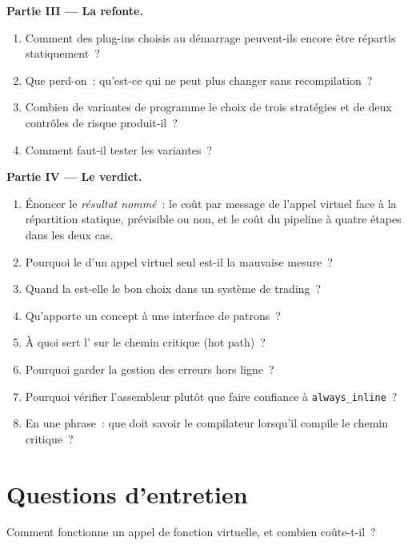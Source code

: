 \begin{problem}
\medskip\noindent\textbf{Partie III --- La refonte.}
\begin{enumerate}[resume]
\item Comment des plug-ins choisis au démarrage peuvent-ils encore être répartis statiquement~?
\item Que perd-on~: qu'est-ce qui ne peut plus changer sans recompilation~?
\item Combien de variantes de programme le choix de trois stratégies et de deux contrôles de risque produit-il~?
\item Comment faut-il tester les variantes~?
\end{enumerate}

\medskip\noindent\textbf{Partie IV --- Le verdict.}
\begin{enumerate}[resume]
\item Énoncer le \emph{résultat nommé}~: le coût par message de l'appel virtuel face à la répartition statique, prévisible ou non, et le
coût du pipeline à quatre étapes dans les deux cas.
\item Pourquoi le  d'un appel virtuel seul est-il la mauvaise mesure~?
\item Quand la  est-elle le bon choix dans un système de trading~?
\item Qu'apporte un concept à une interface de patrons~?
\item À quoi sert l' sur le chemin critique (hot path)~?
\item Pourquoi garder la gestion des erreurs hors ligne~?
\item Pourquoi vérifier l'assembleur plutôt que faire confiance à \texttt{always\_inline}~?
\item En une phrase~: que doit savoir le compilateur lorsqu'il compile le chemin critique~?
\end{enumerate}
\end{problem}

\section{Questions d'entretien}

\begin{interviewq}\label{iq:ll:cpp-for-latency-ii-compile-time:1}
Comment fonctionne un appel de fonction virtuelle, et combien coûte-t-il~?
\end{interviewq}

